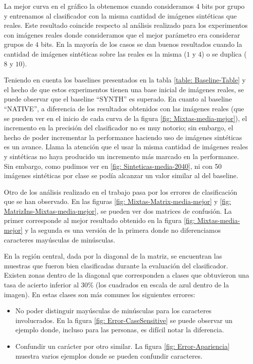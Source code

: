 	 La mejor curva en el gráfico la obtenemos cuando consideramos $4$ bits por grupo y entrenamos al clasificador con la misma cantidad de imágenes sintéticas que reales. Este resultado coincide respecto al análisis realizado para los experimentos con imágenes reales donde consideramos que el mejor parámetro era considerar grupos de $4$ bits. En la mayoría de los casos se dan buenos resultados cuando la cantidad de imágenes sintéticas sobre las reales es la misma ($1$ y $4$) o se duplica ($8$ y $10$).

	 Teniendo en cuenta los baselines presentados en la tabla \ref{table: Baseline-Table} y el hecho de que estos experimentos tienen una base inicial de imágenes reales, se puede observar que el baseline ``SYNTH'' es superado. En cuanto al baseline ``NATIVE'', a diferencia de los resultados obtenidos con las imágenes reales (que se pueden ver en el inicio de cada curva de la figura \ref{fig: Mixtas-media-mejor}), el incremento en la precisión del clasificador no es muy notorio; sin embargo, el hecho de poder incrementar la performance haciendo uso de imágenes sintéticas es un avance. Llama la atención que el usar la misma cantidad de imágenes reales y sintéticas no haya producido un incremento más marcado en la performance. Sin embargo, como pudimos ver en \ref{fig: Sinteticas-media-2040}, ni con 50 imágenes sintéticas por clase se podía alcanzar un valor similar al del baseline.

	Otro de los análisis realizado en el trabajo pasa por los errores de clasificación que se han observado. En las figuras \ref{fig: Mixtas-Matrix-media-mejor} y \ref{fig: MatrizIns-Mixtas-media-mejor}, se pueden ver dos matrices de confusión. La primer corresponde al mejor resultado obtenido en la figura \ref{fig: Mixtas-media-mejor} y la segunda es una versión de la primera donde no diferenciamos caracteres mayúsculas de minúsculas.

	En la región central, dada por la diagonal de la matriz, se encuentran las muestras que fueron bien clasificadas durante la evaluación del clasificador. Existen zonas dentro de la diagonal que corresponden a clases que obtuvieron una tasa de acierto inferior al $30\%$ (los cuadrados en escala de azul dentro de la imagen). En estas clases son más comunes los siguientes errores:

	\begin{itemize}
		\item No poder distinguir mayúsculas de minúsculas para los caracteres involucrados. En la figura \ref{fig: Error-CaseSensitive} se puede observar un ejemplo donde, incluso para las personas, es difícil notar la diferencia.
		\item Confundir un carácter por otro similar. La figura \ref{fig: Error-Apariencia} muestra varios ejemplos donde se pueden confundir caracteres.
	\end{itemize}

